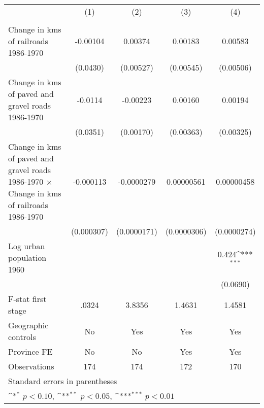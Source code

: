 {
\def\sym#1{\ifmmode^{#1}\else\(^{#1}\)\fi}
\begin{tabular}{l*{4}{c}}
\hline\hline
                &\multicolumn{1}{c}{(1)}&\multicolumn{1}{c}{(2)}&\multicolumn{1}{c}{(3)}&\multicolumn{1}{c}{(4)}\\
                &\multicolumn{1}{c}{}&\multicolumn{1}{c}{}&\multicolumn{1}{c}{}&\multicolumn{1}{c}{}\\
\hline
Change in kms of railroads 1986-1970& -0.00104         &  0.00374         &  0.00183         &  0.00583         \\
                & (0.0430)         &(0.00527)         &(0.00545)         &(0.00506)         \\
[1em]
Change in kms of paved and gravel roads 1986-1970&  -0.0114         & -0.00223         &  0.00160         &  0.00194         \\
                & (0.0351)         &(0.00170)         &(0.00363)         &(0.00325)         \\
[1em]
Change in kms of paved and gravel roads 1986-1970 $\times$ Change in kms of railroads 1986-1970&-0.000113         &-0.0000279         &0.00000561         &0.00000458         \\
                &(0.000307)         &(0.0000171)         &(0.0000306)         &(0.0000274)         \\
[1em]
Log urban population 1960&                  &                  &                  &    0.424\sym{***}\\
                &                  &                  &                  & (0.0690)         \\
\hline
F-stat first stage&    .0324         &   3.8356         &   1.4631         &   1.4581         \\
Geographic controls&       No         &      Yes         &      Yes         &      Yes         \\
Province FE     &       No         &       No         &      Yes         &      Yes         \\
Observations    &      174         &      174         &      172         &      170         \\
\hline\hline
\multicolumn{5}{l}{\footnotesize Standard errors in parentheses}\\
\multicolumn{5}{l}{\footnotesize \sym{*} \(p<0.10\), \sym{**} \(p<0.05\), \sym{***} \(p<0.01\)}\\
\end{tabular}
}
